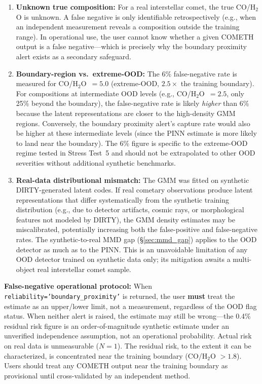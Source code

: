 \documentclass[usenatbib]{mnras}
\begin{document}
\begin{enumerate}
    \item \textbf{Unknown true composition:} For a real interstellar comet, the true CO/H$_2$O is unknown. A false negative is only identifiable retrospectively (e.g., when an independent measurement reveals a composition outside the training range). In operational use, the user cannot know whether a given COMETH output is a false negative---which is precisely why the boundary proximity alert exists as a secondary safeguard.
    \item \textbf{Boundary-region vs.\ extreme-OOD:} The 6\% false-negative rate is measured for CO/H$_2$O~$=5.0$ (extreme-OOD, $2.5\times$ the training boundary). For compositions at intermediate OOD levels (e.g., CO/H$_2$O~$=2.5$, only 25\% beyond the boundary), the false-negative rate is likely \textit{higher} than 6\% because the latent representations are closer to the high-density GMM regions. Conversely, the boundary proximity alert's capture rate would also be higher at these intermediate levels (since the PINN estimate is more likely to land near the boundary). The 6\% figure is specific to the extreme-OOD regime tested in Stress Test~5 and should not be extrapolated to other OOD severities without additional synthetic benchmarks.
    \item \textbf{Real-data distributional mismatch:} The GMM was fitted on synthetic DIRTY-generated latent codes. If real cometary observations produce latent representations that differ systematically from the synthetic training distribution (e.g., due to detector artifacts, cosmic rays, or morphological features not modeled by DIRTY), the GMM density estimates may be miscalibrated, potentially increasing both the false-positive and false-negative rates. The synthetic-to-real MMD gap (\S\ref{sec:mmd_gap}) applies to the OOD detector as much as to the PINN. This is an unavoidable limitation of any OOD detector trained on synthetic data only; its mitigation awaits a multi-object real interstellar comet sample.
\end{enumerate}

\textbf{False-negative operational protocol:} When \texttt{reliability='boundary\_proximity'} is returned, the user \textbf{must} treat the estimate as an upper/lower limit, not a measurement, regardless of the OOD flag status. When neither alert is raised, the estimate may still be wrong---the 0.4\% residual risk figure is an order-of-magnitude synthetic estimate under an unverified independence assumption, not an operational probability. Actual risk on real data is unmeasurable ($N=1$). The residual risk, to the extent it can be characterized, is concentrated near the training boundary (CO/H$_2$O $> 1.8$). Users should treat any COMETH output near the training boundary as provisional until cross-validated by an independent method.
\end{document}
